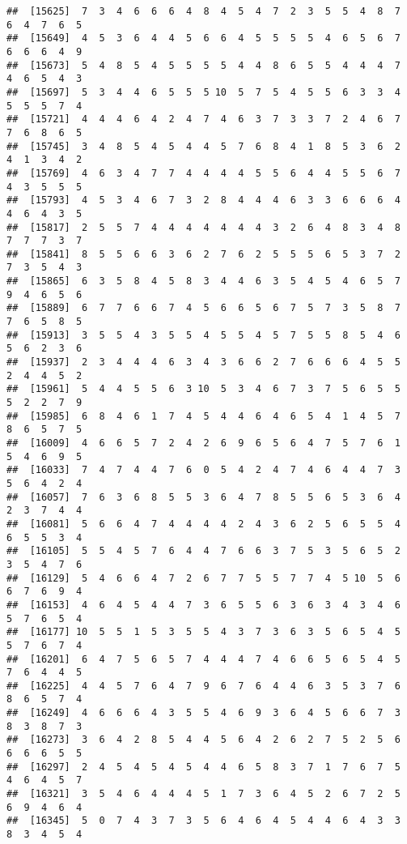\documentclass[
]{book}
\begin{document}
\begin{verbatim}
##  [15625]  7  3  4  6  6  6  4  8  4  5  4  7  2  3  5  5  4  8  7  6  4  7  6  5
##  [15649]  4  5  3  6  4  4  5  6  6  4  5  5  5  5  4  6  5  6  7  6  6  6  4  9
##  [15673]  5  4  8  5  4  5  5  5  5  4  4  8  6  5  5  4  4  4  7  4  6  5  4  3
##  [15697]  5  3  4  4  6  5  5  5 10  5  7  5  4  5  5  6  3  3  4  5  5  5  7  4
##  [15721]  4  4  4  6  4  2  4  7  4  6  3  7  3  3  7  2  4  6  7  7  6  8  6  5
##  [15745]  3  4  8  5  4  5  4  4  5  7  6  8  4  1  8  5  3  6  2  4  1  3  4  2
##  [15769]  4  6  3  4  7  7  4  4  4  4  5  5  6  4  4  5  5  6  7  4  3  5  5  5
##  [15793]  4  5  3  4  6  7  3  2  8  4  4  4  6  3  3  6  6  6  4  4  6  4  3  5
##  [15817]  2  5  5  7  4  4  4  4  4  4  4  3  2  6  4  8  3  4  8  7  7  7  3  7
##  [15841]  8  5  5  6  6  3  6  2  7  6  2  5  5  5  6  5  3  7  2  7  3  5  4  3
##  [15865]  6  3  5  8  4  5  8  3  4  4  6  3  5  4  5  4  6  5  7  9  4  6  5  6
##  [15889]  6  7  7  6  6  7  4  5  6  6  5  6  7  5  7  3  5  8  7  7  6  5  8  5
##  [15913]  3  5  5  4  3  5  5  4  5  5  4  5  7  5  5  8  5  4  6  5  6  2  3  6
##  [15937]  2  3  4  4  4  6  3  4  3  6  6  2  7  6  6  6  4  5  5  2  4  4  5  2
##  [15961]  5  4  4  5  5  6  3 10  5  3  4  6  7  3  7  5  6  5  5  5  2  2  7  9
##  [15985]  6  8  4  6  1  7  4  5  4  4  6  4  6  5  4  1  4  5  7  8  6  5  7  5
##  [16009]  4  6  6  5  7  2  4  2  6  9  6  5  6  4  7  5  7  6  1  5  4  6  9  5
##  [16033]  7  4  7  4  4  7  6  0  5  4  2  4  7  4  6  4  4  7  3  5  6  4  2  4
##  [16057]  7  6  3  6  8  5  5  3  6  4  7  8  5  5  6  5  3  6  4  2  3  7  4  4
##  [16081]  5  6  6  4  7  4  4  4  4  2  4  3  6  2  5  6  5  5  4  6  5  5  3  4
##  [16105]  5  5  4  5  7  6  4  4  7  6  6  3  7  5  3  5  6  5  2  3  5  4  7  6
##  [16129]  5  4  6  6  4  7  2  6  7  7  5  5  7  7  4  5 10  5  6  6  7  6  9  4
##  [16153]  4  6  4  5  4  4  7  3  6  5  5  6  3  6  3  4  3  4  6  5  7  6  5  4
##  [16177] 10  5  5  1  5  3  5  5  4  3  7  3  6  3  5  6  5  4  5  5  7  6  7  4
##  [16201]  6  4  7  5  6  5  7  4  4  4  7  4  6  6  5  6  5  4  5  7  6  4  4  5
##  [16225]  4  4  5  7  6  4  7  9  6  7  6  4  4  6  3  5  3  7  6  8  6  5  7  4
##  [16249]  4  6  6  6  4  3  5  5  4  6  9  3  6  4  5  6  6  7  3  8  3  8  7  3
##  [16273]  3  6  4  2  8  5  4  4  5  6  4  2  6  2  7  5  2  5  6  6  6  6  5  5
##  [16297]  2  4  5  4  5  4  5  4  4  6  5  8  3  7  1  7  6  7  5  4  6  4  5  7
##  [16321]  3  5  4  6  4  4  4  5  1  7  3  6  4  5  2  6  7  2  5  6  9  4  6  4
##  [16345]  5  0  7  4  3  7  3  5  6  4  6  4  5  4  4  6  4  3  3  8  3  4  5  4

\end{verbatim}
\end{document}
